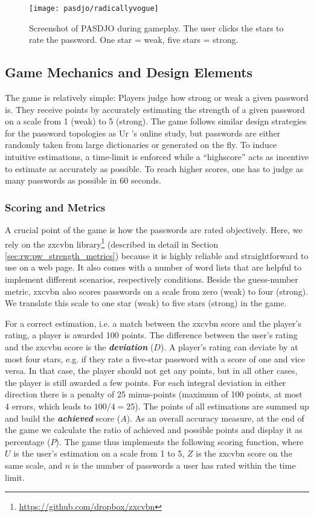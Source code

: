 \begin{figure}
	\centering
	\texttt{[image: pasdjo/radicallyvogue]}
	\caption{\label{fig:pasdjo:radicallyvogue} Screenshot of PASDJO during gameplay. The user clicks the stars to rate the password. One star = weak, five stars = strong. }
\end{figure}

\subsection{Game Mechanics and Design Elements}
The game is relatively simple: Players judge how strong or weak a given password is. They receive points by accurately estimating the strength of a given password on a scale from 1 (weak) to 5 (strong). The game follows similar design strategies for the password topologies as Ur \etal's online study, but passwords are either randomly taken from large dictionaries or generated on the fly. To induce intuitive estimations, a time-limit is enforced while a ``highscore'' acts as incentive to estimate as accurately as possible. To reach higher scores, one has to judge as many passwords as possible in 60 seconds. 

\subsubsection{Scoring and Metrics}
A crucial point of the game is how the passwords are rated objectively. Here, we rely on the zxcvbn library\footnote{\url{https://github.com/dropbox/zxcvbn}} (described in detail in Section \ref{sec:rw:pw_strength_metrics}) because it is highly reliable and straightforward to use on a web page. It also comes with a number of word lists that are helpful to implement different scenarios, respectively conditions. Beside the guess-number metric, zxcvbn also scores passwords on a scale from zero (weak) to four (strong). We translate this scale to one star (weak) to five stars (strong) in the game. 

For a correct estimation, i.e. a match between the zxcvbn score and the player's rating, a player is awarded 100 points. The difference between the user's rating and the zxcvbn score is the \textbf{\textit{deviation}} ($D$). A player's rating can deviate by at most four stars, e.g. if they rate a five-star password with a score of one and vice versa. In that case, the player should not get any points, but in all other cases, the player is still awarded a few points. For each integral deviation in either direction there is a penalty of 25 minus-points (maximum of 100 points, at most 4 errors, which leads to $100 / 4 = 25$). The points of all estimations are summed up and build the \textbf{\textit{achieved}} score ($A$). As an overall accuracy measure, at the end of the game we calculate the ratio of achieved and possible points and display it as percentage ($P$). The game thus implements the following scoring function, where $U$ is the user's estimation on a scale from 1 to 5, $Z$ is the zxcvbn score on the same scale, and $n$ is the number of passwords a user has rated within the time limit. 

